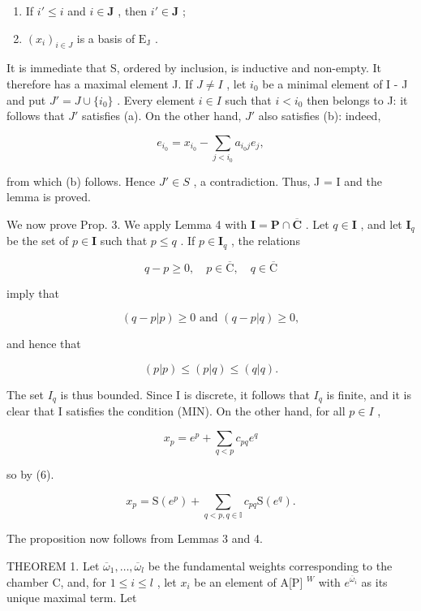 \begin{enumerate}
\def\labelenumi{(\alph{enumi})}
\item
  If \(i' \leqslant i\) and \(i \in \mathbf{J}\) , then \(i' \in \mathbf{J}\) ;
\item
  \((x_{i})_{i\in J}\) is a basis of \(\mathrm{E_J}\) .
\end{enumerate}

It is immediate that S, ordered by inclusion, is inductive and non-empty. It therefore has a maximal element J. If \(J \neq I\) , let \(i_{0}\) be a minimal element of I - J and put \(J' = J \cup \{i_{0}\}\) . Every element \(i \in I\) such that \(i < i_{0}\) then belongs to J: it follows that \(J'\) satisfies (a). On the other hand, \(J'\) also satisfies (b): indeed,

\[
e _ {i _ {0}} = x _ {i _ {0}} - \sum_ {j <   i _ {0}} a _ {i _ {0} j} e _ {j},
\]

from which (b) follows. Hence \(J' \in S\) , a contradiction. Thus, J = I and the lemma is proved.

We now prove Prop. 3. We apply Lemma 4 with \(\mathbf{I} = \mathbf{P} \cap \overline{\mathbf{C}}\) . Let \(q \in \mathbf{I}\) , and let \(\mathbf{I}_q\) be the set of \(p \in \mathbf{I}\) such that \(p \leqslant q\) . If \(p \in \mathbf{I}_q\) , the relations

\[
q - p \geqslant 0, \quad p \in \overline {{\mathrm{C}}}, \quad q \in \overline {{\mathrm{C}}}
\]

imply that

\[
(q - p | p) \geqslant 0 \text { and } (q - p | q) \geqslant 0,
\]

and hence that

\[
(p | p) \leqslant (p | q) \leqslant (q | q).
\]

The set \(I_{q}\) is thus bounded. Since I is discrete, it follows that \(I_{q}\) is finite, and it is clear that I satisfies the condition (MIN). On the other hand, for all \(p \in I\) ,

\[
x _ {p} = e ^ {p} + \sum_ {q <   p} c _ {p q} e ^ {q}
\]

so by (6).

\[
x _ {p} = \mathrm{S} (e ^ {p}) + \sum_ {q <   p, q \in \mathbb {I}} c _ {p q} \mathrm{S} (e ^ {q}).
\]

The proposition now follows from Lemmas 3 and 4.

THEOREM 1. Let \(\overline{\omega}_1, \ldots, \overline{\omega}_l\) be the fundamental weights corresponding to the chamber C, and, for \(1 \leqslant i \leqslant l\) , let \(x_i\) be an element of A{[}P{]} \(^W\) with \(e^{\overline{\omega}_i}\) as its unique maximal term. Let

